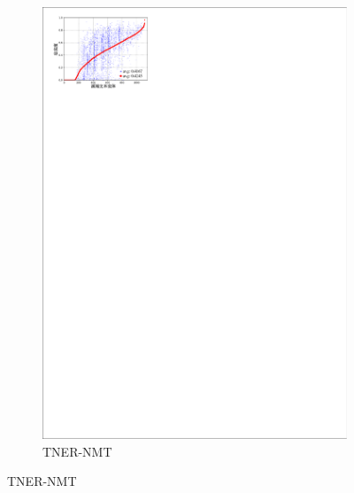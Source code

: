 \begin{figure}[!htbp]
\begin{subfigure}[b]{0.45\textwidth}
      \includegraphics[width=\textwidth]{Img/fig_4_fidelity_tner.pdf}
      \caption{TNER-NMT}
      \label{fig:4_fidelity_tner}
    \end{subfigure}
    \label{fig:4_fidelity}
\end{figure}